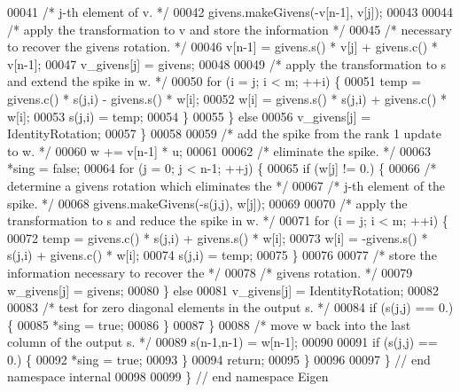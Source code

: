 \begin{DoxyCode}
00041             \textcolor{comment}{/* j-th element of v. */}
00042             givens.makeGivens(-v[n-1], v[j]);
00043 
00044             \textcolor{comment}{/* apply the transformation to v and store the information */}
00045             \textcolor{comment}{/* necessary to recover the givens rotation. */}
00046             v[n-1] = givens.s() * v[j] + givens.c() * v[n-1];
00047             v\_givens[j] = givens;
00048 
00049             \textcolor{comment}{/* apply the transformation to s and extend the spike in w. */}
00050             \textcolor{keywordflow}{for} (i = j; i < m; ++i) \{
00051                 temp = givens.c() * s(j,i) - givens.s() * w[i];
00052                 w[i] = givens.s() * s(j,i) + givens.c() * w[i];
00053                 s(j,i) = temp;
00054             \}
00055         \} \textcolor{keywordflow}{else}
00056             v\_givens[j] = IdentityRotation;
00057     \}
00058 
00059     \textcolor{comment}{/* add the spike from the rank 1 update to w. */}
00060     w += v[n-1] * u;
00061 
00062     \textcolor{comment}{/* eliminate the spike. */}
00063     *sing = \textcolor{keyword}{false};
00064     \textcolor{keywordflow}{for} (j = 0; j < n-1; ++j) \{
00065         \textcolor{keywordflow}{if} (w[j] != 0.) \{
00066             \textcolor{comment}{/* determine a givens rotation which eliminates the */}
00067             \textcolor{comment}{/* j-th element of the spike. */}
00068             givens.makeGivens(-s(j,j), w[j]);
00069 
00070             \textcolor{comment}{/* apply the transformation to s and reduce the spike in w. */}
00071             \textcolor{keywordflow}{for} (i = j; i < m; ++i) \{
00072                 temp = givens.c() * s(j,i) + givens.s() * w[i];
00073                 w[i] = -givens.s() * s(j,i) + givens.c() * w[i];
00074                 s(j,i) = temp;
00075             \}
00076 
00077             \textcolor{comment}{/* store the information necessary to recover the */}
00078             \textcolor{comment}{/* givens rotation. */}
00079             w\_givens[j] = givens;
00080         \} \textcolor{keywordflow}{else}
00081             v\_givens[j] = IdentityRotation;
00082 
00083         \textcolor{comment}{/* test for zero diagonal elements in the output s. */}
00084         \textcolor{keywordflow}{if} (s(j,j) == 0.) \{
00085             *sing = \textcolor{keyword}{true};
00086         \}
00087     \}
00088     \textcolor{comment}{/* move w back into the last column of the output s. */}
00089     s(n-1,n-1) = w[n-1];
00090 
00091     \textcolor{keywordflow}{if} (s(j,j) == 0.) \{
00092         *sing = \textcolor{keyword}{true};
00093     \}
00094     \textcolor{keywordflow}{return};
00095 \}
00096 
00097 \} \textcolor{comment}{// end namespace internal}
00098 
00099 \} \textcolor{comment}{// end namespace Eigen}
\end{DoxyCode}
